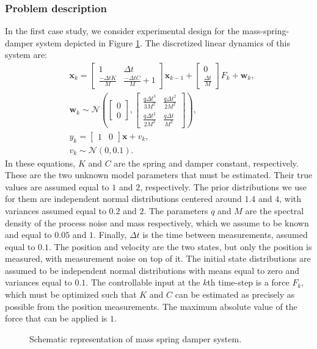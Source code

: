 \subsubsection{Problem description}
In the first case study, we consider experimental design for the mass-spring-damper system depicted in Figure \ref{fig:msd}. The discretized linear dynamics of this system are:
\begin{equation}
\begin{aligned}
&\bm x_k = \begin{bmatrix}
1 & \Delta t\\
\frac{-\Delta tK}{M} & \frac{-\Delta tC}{M} + 1
\end{bmatrix} \bm x_{k-1} +
\begin{bmatrix} 0 \\ \frac{\Delta t}{M}\end{bmatrix} F_k + 
\bm w_k,\\
&\bm w_k \sim  \mathcal{N}\left(\begin{bmatrix}0\\0\end{bmatrix},
\begin{bmatrix}\frac{q\Delta t^3}{3M^2} & \frac{q\Delta t^2}{2M^2} \\\frac{q\Delta t^2}{2M^2}  & \frac{q \Delta t}{M^2} \end{bmatrix}\right),\\
&y_k = \begin{bmatrix} 1 & 0 \end{bmatrix} \bm x + v_k,\\
&v_k \sim \mathcal{N}(0,0.1).
\end{aligned}
\end{equation}
In these equations, $K$ and $C$ are the spring and damper constant, respectively. These are the two unknown model parameters that must be estimated. Their true values are assumed equal to $1$ and $2$, respectively. The prior distributions we use for them are independent normal distributions centered around $1.4$ and $4$, with variances assumed equal to $0.2$ and $2$. The parameters $q$ and $M$ are the spectral density of the process noise and mass respectively, which we assume to be known and equal to $0.05$ and $1$. Finally, $\Delta t$ is the time between measurements, assumed equal to $0.1$. The position and velocity are the two states, but only the position is measured, with measurement noise on top of it. The initial state distributions are assumed to be independent normal distributions with means equal to zero and variances equal to $0.1$. The controllable input at the $k$th time-step is a force $F_k$, which must be optimized such that $K$ and $C$ can be estimated as precisely as possible from the position measurements. The maximum absolute value of the force that can be applied is $1$.
\begin{figure}[H]
	\centering
	
	\caption{Schematic representation of mass spring damper system.} 
	\label{fig:msd}
\end{figure}
